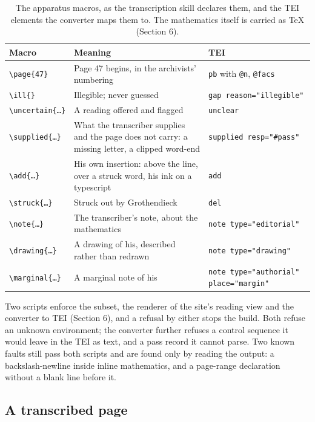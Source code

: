 \documentclass[11pt]{article}
\begin{document}
\begin{table}[htbp]\centering\small
\caption{The apparatus macros, as the transcription skill declares them, and the TEI elements the converter maps them to. The mathematics itself is carried as TeX (Section 6).}\label{tab:macros}
\begin{tabular}{lp{5.3cm}l}\toprule
Macro & Meaning & TEI\\\midrule
\texttt{\textbackslash page\{47\}} & Page 47 begins, in the archivists' numbering & \texttt{pb} with \texttt{@n}, \texttt{@facs}\\
\texttt{\textbackslash ill\{\}} & Illegible; never guessed & \texttt{gap reason="illegible"}\\
\texttt{\textbackslash uncertain\{…\}} & A reading offered and flagged & \texttt{unclear}\\
\texttt{\textbackslash supplied\{…\}} & What the transcriber supplies and the page does not carry: a missing letter, a clipped word-end & \texttt{supplied resp="\#pass"}\\
\texttt{\textbackslash add\{…\}} & His own insertion: above the line, over a struck word, his ink on a typescript & \texttt{add}\\
\texttt{\textbackslash struck\{…\}} & Struck out by Grothendieck & \texttt{del}\\
\texttt{\textbackslash note\{…\}} & The transcriber's note, about the mathematics & \texttt{note type="editorial"}\\
\texttt{\textbackslash drawing\{…\}} & A drawing of his, described rather than redrawn & \texttt{note type="drawing"}\\
\texttt{\textbackslash marginal\{…\}} & A marginal note of his & \texttt{note type="authorial" place="margin"}\\\bottomrule
\end{tabular}
\end{table}

Two scripts enforce the subset, the renderer of the site's reading view and the converter to TEI (Section 6), and a refusal by either stops the build. Both refuse an unknown environment; the converter further refuses a control sequence it would leave in the TEI as text, and a pass record it cannot parse. Two known faults still pass both scripts and are found only by reading the output: a backslash-newline inside inline mathematics, and a page-range declaration without a blank line before it.

\subsection{A transcribed page}
\end{document}
